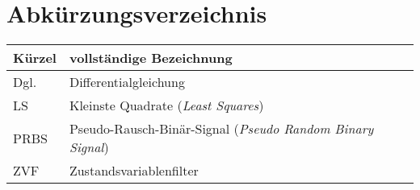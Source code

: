 \chapter*{Abkürzungsverzeichnis}
{}%
\begin{tabularx}{\textwidth}{@{}l@{\qquad}X}
	Kürzel	&	vollständige Bezeichnung\\\midrule
	Dgl.	&	Differentialgleichung\\
	LS		&	Kleinste Quadrate (\emph{Least Squares})\\
	PRBS	&	Pseudo-Rausch-Binär-Signal (\emph{Pseudo Random Binary Signal})\\
	ZVF		&	Zustandsvariablenfilter
\end{tabularx}